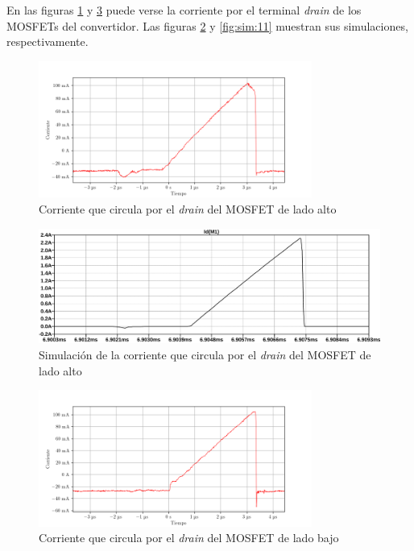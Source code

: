 En las figuras \ref{fig:osc:20} y \ref{fig:osc:22} puede verse la corriente por el terminal \textit{drain} de los MOSFETs del convertidor. Las figuras \ref{fig:sim:10} y \ref{fig:sim:11} muestran sus simulaciones, respectivamente.

\begin{figure}[H]
    \centering
    \includegraphics[width=0.8\textwidth]{images/capturas-osciloscopio/17-11-2022/20.png}
    \caption{Corriente que circula por el \textit{drain} del MOSFET de lado alto}
    \label{fig:osc:20}
\end{figure}

\begin{figure}[H]
    \centering
    \includegraphics[width=\textwidth]{images/sim/10.pdf}
    \caption{Simulación de la corriente que circula por el \textit{drain} del MOSFET de lado alto}
    \label{fig:sim:10}
\end{figure}

\begin{figure}[H]
    \centering
    \includegraphics[width=0.8\textwidth]{images/capturas-osciloscopio/17-11-2022/22.png}
    \caption{Corriente que circula por el \textit{drain} del MOSFET de lado bajo}
    \label{fig:osc:22}
\end{figure}

